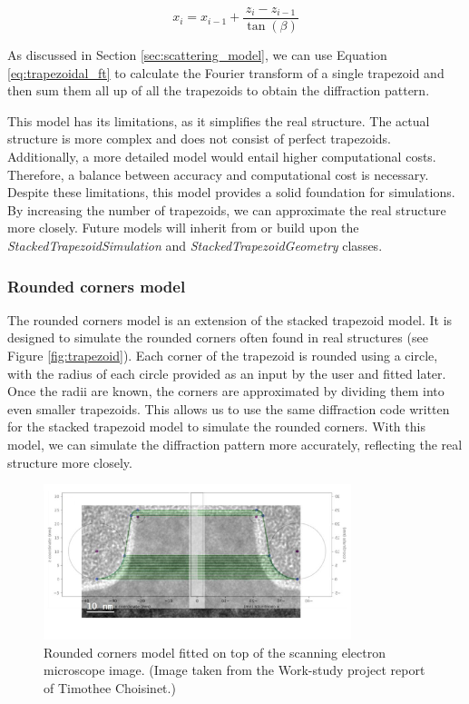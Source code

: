 \medskip

\begin{equation}
    x_{i} = x_{i-1} + \frac{z_{i} - z_{i-1}}{\tan(\beta)}
\end{equation}

\medskip

As discussed in Section \ref{sec:scattering_model}, we can use Equation \ref{eq:trapezoidal_ft} 
to calculate the Fourier transform of a single trapezoid and then sum them all up of 
all the trapezoids to obtain the diffraction pattern.

\medskip

This model has its limitations, as it simplifies the real structure. The actual structure is more 
complex and does not consist of perfect trapezoids. Additionally, a more detailed model would 
entail higher computational costs. Therefore, a balance between accuracy and computational cost 
is necessary. Despite these limitations, this model provides a solid foundation for simulations. 
By increasing the number of trapezoids, we can approximate the real structure more closely. Future
models will inherit from or build upon the \textit{StackedTrapezoidSimulation} and 
\textit{StackedTrapezoidGeometry} classes.

\medskip

\subsubsection{Rounded corners model}

The rounded corners model is an extension of the stacked trapezoid model. It is designed to 
simulate the rounded corners often found in real structures (see Figure \ref{fig:trapezoid}). 
Each corner of the trapezoid is rounded using a circle, with the radius of each circle provided 
as an input by the user and fitted later. Once the radii are known, the corners are approximated 
by dividing them into even smaller trapezoids. This allows us to use the same diffraction code written for the
stacked trapezoid model to simulate the rounded corners. With this model, we can simulate the 
diffraction pattern more accurately, reflecting the real structure more closely.

\begin{figure}[h]
    \centering
    \includegraphics[width=0.8\textwidth]{images/rounded.PNG}
    \caption{Rounded corners model fitted on top of the scanning electron microscope image. (Image taken from the Work-study project report of Timothee Choisinet.) }
    \label{fig:rounded_corners}
\end{figure}

